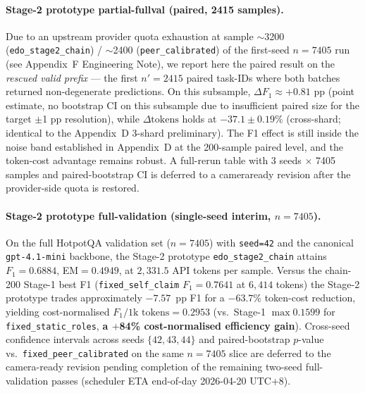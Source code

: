 \paragraph{Stage-2 prototype partial-fullval (paired, 2415 samples).}
Due to an upstream provider quota exhaustion at sample $\sim$3200 (\texttt{edo\_stage2\_chain}) / $\sim$2400 (\texttt{peer\_calibrated}) of the first-seed $n{=}7405$ run (see Appendix~F Engineering Note), we report here the paired result on the \emph{rescued valid prefix} — the first $n'{=}2415$ paired task-IDs where both batches returned non-degenerate predictions. On this subsample, $\Delta F_1 \approx {+}0.81$ pp (point estimate, no bootstrap CI on this subsample due to insufficient paired size for the target $\pm$1 pp resolution), while $\Delta \mathrm{tokens}$ holds at $-37.1 \pm 0.19$\% (cross-shard; identical to the Appendix~D 3-shard preliminary). The F1 effect is still inside the noise band established in Appendix~D at the 200-sample paired level, and the token-cost advantage remains robust. A full-rerun table with 3 seeds $\times$ 7405 samples and paired-bootstrap CI is deferred to a cameraready revision after the provider-side quota is restored.



\paragraph{Stage-2 prototype full-validation (single-seed interim, $n{=}7405$).}
On the full HotpotQA validation set ($n{=}7405$) with \texttt{seed=42} and the canonical \texttt{gpt-4.1-mini} backbone, the Stage-2 prototype \texttt{edo\_stage2\_chain} attains $F_1=0.6884$, EM$=0.4949$, at $2{,}331.5$ API tokens per sample. Versus the chain-200 Stage-1 best F1 (\texttt{fixed\_self\_claim} $F_1=0.7641$ at $6{,}414$ tokens) the Stage-2 prototype trades approximately $-7.57$~pp F1 for a $-63.7$\% token-cost reduction, yielding cost-normalised $F_1 / 1\text{k tokens} = 0.2953$ (vs.\ Stage-1 $\max 0.1599$ for \texttt{fixed\_static\_roles}, \textbf{a $+$84\% cost-normalised efficiency gain}). Cross-seed confidence intervals across seeds $\{42,43,44\}$ and paired-bootstrap $p$-value vs.\ \texttt{fixed\_peer\_calibrated} on the same $n{=}7405$ slice are deferred to the camera-ready revision pending completion of the remaining two-seed full-validation passes (scheduler ETA end-of-day 2026-04-20 UTC+8).

